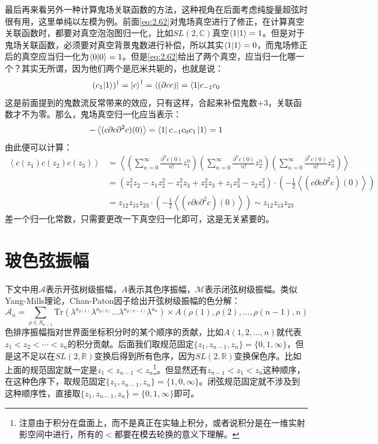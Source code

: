 最后再来看另外一种计算鬼场关联函数的方法，这种视角在后面考虑纯旋量超弦时很有用，这里单纯以左模为例。前面\ref{eq:2.62}对鬼场真空进行了修正，在计算真空关联函数时，都要对真空泡泡图归一化，比如$SL(2,\mathbb{C})$真空$\braket{1}=1$。但是对于鬼场关联函数，必须要对真空背景鬼数进行补偿，所以其实$\braket{1}=0$，而鬼场修正后的真空应当归一化为$\braket{0}=1$。但是\ref{eq:2.62}给出了两个真空，应当归一化哪一个？其实无所谓，因为他们两个是厄米共轭的，也就是说：
\begin{equation}
	(c_1|1\rangle)^\dagger=\ket{c}^\dagger = \bra{(\partial c c)}=\langle1|c_{-1}c_0
\end{equation}
这是前面提到的鬼数流反常带来的效应，只有这样，合起来补偿鬼数$+3$，关联函数才不为零。那么，鬼场真空归一化应当表示：
\begin{equation}
	\label{eq:bc_norm}
	-\left\langle (c\partial c\partial^2c)(0)\right\rangle = \bra{1}c_{-1}c_0c_1\ket{1}=1
\end{equation}
由此便可以计算：
\begin{equation}
\begin{aligned}
		\left\langle c(z_1)c(z_2)c(z_3)\right\rangle &= \left\langle \left(\sum_{n=0}^\infty \frac{\partial^nc(0)}{n!}z_1^n\right) \left(\sum_{n=0}^\infty \frac{\partial^nc(0)}{n!}z_2^n\right)\left(\sum_{n=0}^\infty \frac{\partial^nc(0)}{n!}z_3^n\right)\right\rangle\\
		&=\left(z_1^2 z_2 - z_1 z_2^2 - z_1^2 z_3 + z_2^2 z_3 + z_1 z_3^2 - z_2 z_3^2\right)\cdot \left(-\frac12\left\langle (c\partial c\partial^2c)(0)\right\rangle\right)\\
	&= z_{12}z_{13}z_{23}\cdot\left(-\frac12\left\langle (c\partial c\partial^2c)(0)\right\rangle\right)\sim z_{12}z_{13}z_{23}
\end{aligned}
\end{equation}
差一个归一化常数，只需要更改一下真空归一化即可，这是无关紧要的。
\section{玻色弦振幅}
\label{sec:4.3}
下文中用$\mathcal{A}$表示开弦树级振幅，$A$表示其色序振幅，$\mathcal{M}$表示闭弦树级振幅。类似Yang-Mills理论，Chan-Paton因子给出开弦树级振幅的色分解：
\begin{equation}
	\mathcal{A}_n=\sum_{\rho\in S_{n-1}}\mathrm{Tr}(\lambda^{a_{\rho(1)}}\lambda^{a_{\rho(2)}}\ldots \lambda^{a_{\rho(n-1)}}\lambda^{a_{n}})\times A(\rho(1),\rho(2),\ldots,\rho(n-1),n)
\end{equation}
色排序振幅指对世界面坐标积分时的某个顺序的贡献，比如$A(1,2,\ldots,n)$就代表$z_1<z_2<\cdots<z_n$的积分贡献。后面我们取规范固定$\{z_1,z_{n-1},z_n\}=\{0,1,\infty\}$，但是这不足以在$SL(2,\mathbb{R})$变换后得到所有色序，因为$SL(2,\mathbb{R})$变换保色序。比如上面的规范固定就一定是$z_1<z_{n-1}<z_n$\footnote{注意由于积分在盘面上，而不是真正在实轴上积分，或者说积分是在一维实射影空间中进行，所有的$<$都要在模去轮换的意义下理解。}。但显然还有$z_{n-1}<z_1<z_n$这种顺序，在这种色序下，取规范固定$\{z_1,z_{n-1},z_n\}=\{1,0,\infty\}$。闭弦规范固定就不涉及到这种顺序性，直接取$\{z_1,z_{n-1},z_n\}=\{0,1,\infty\}$即可。
